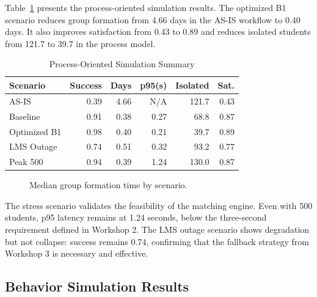 \documentclass[conference]{IEEEtran}
\begin{document}
Table~\ref{tab:process} presents the process-oriented simulation results. The optimized B1 scenario reduces group formation from 4.66 days in the AS-IS workflow to 0.40 days. It also improves satisfaction from 0.43 to 0.89 and reduces isolated students from 121.7 to 39.7 in the process model.

\begin{table}[htbp]
\caption{Process-Oriented Simulation Summary}
\label{tab:process}
\centering
\begin{tabular}{lrrrrr}
\toprule
\textbf{Scenario} & \textbf{Success} & \textbf{Days} & \textbf{p95(s)} & \textbf{Isolated} & \textbf{Sat.} \\
\midrule
AS-IS & 0.39 & 4.66 & N/A & 121.7 & 0.43 \\
Baseline & 0.91 & 0.38 & 0.27 & 68.8 & 0.87 \\
Optimized B1 & 0.98 & 0.40 & 0.21 & 39.7 & 0.89 \\
LMS Outage & 0.74 & 0.51 & 0.32 & 93.2 & 0.77 \\
Peak 500 & 0.94 & 0.39 & 1.24 & 130.0 & 0.87 \\
\bottomrule
\end{tabular}
\end{table}

\begin{figure}[htbp]
\centering
{}
\caption{Median group formation time by scenario.}
\label{fig:formation}
\end{figure}

The stress scenario validates the feasibility of the matching engine. Even with 500 students, p95 latency remains at 1.24 seconds, below the three-second requirement defined in Workshop 2. The LMS outage scenario shows degradation but not collapse: success remains 0.74, confirming that the fallback strategy from Workshop 3 is necessary and effective.

\subsection{Behavior Simulation Results}
\end{document}
